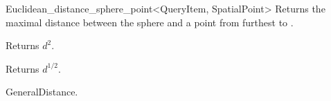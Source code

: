 \begin{ccRefClass}{Euclidean_distance_sphere_point<QueryItem, SpatialPoint>}
{Returns the maximal distance between the sphere  and
a point from  furthest to .}

 {Returns $d^2$.}

 {Returns $d^{1/2}$.}


\ccSeeAlso

GeneralDistance.



\end{ccRefClass}


